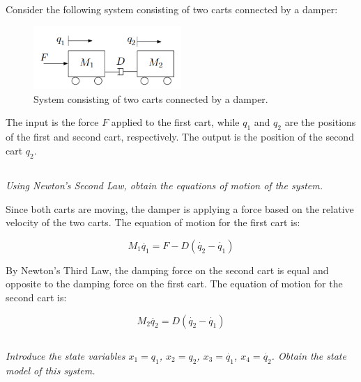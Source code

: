\section{}
Consider the following system consisting of two carts connected by a damper:
\begin{figure}[h]
    \centering
    \includegraphics[width=0.5\textwidth]{Questions/Figures/Q2ProblemDiagram.png}
    \caption{System consisting of two carts connected by a damper.}
    \label{fig:Q2 System}
\end{figure}

The input is the force $F$ applied to the first cart, while $q_1$ and $q_2$ are the positions of the first and second cart, 
respectively. The output is the position of the second cart $q_2$.

\subsection{}
\textit{Using Newton’s Second Law, obtain the equations of motion of the system.}


Since both carts are moving, the damper is applying a force based on the relative velocity of the two carts. The equation of motion for the first cart is:

\begin{equation}
    M_1\ddot{q_1} = F - D(\dot{q_2} - \dot{q_1}) \nonumber
\end{equation}

By Newton's Third Law, the damping force on the second cart is equal and opposite to the damping force on the first cart. The equation of motion for the second cart is:

\begin{equation}
    M_2\ddot{q_2} = D(\dot{q_2} - \dot{q_1}) \nonumber
\end{equation}

\subsection{}
\textit{Introduce the state variables $x_1 = q_1$, $x_2 = q_2$, $x_3 = \dot{q_1}$, $x_4 = \dot{q_2}$. Obtain the state model of this system.}

